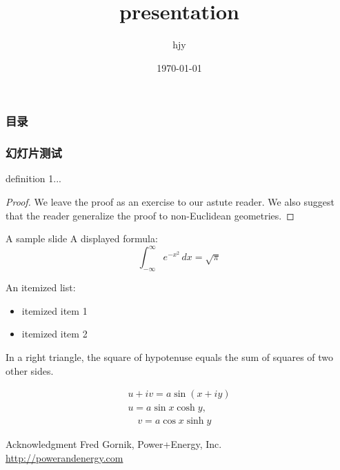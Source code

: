 \documentclass[12pt,a4paper]{beamer}
\author{hjy}
\title{presentation}
\institute{TongJi University}
\date{\today}
\begin{document}
\begin{CJK*}{UTF8}{gkai}
\begin{frame} 				
	\titlepage 
\end{frame}
	
\begin{frame}
	\frametitle{目录}
	\tableofcontents
\end{frame}
  
\begin{frame}
	\frametitle{幻灯片测试}
	\setlength{\fboxrule}{4pt} 
	
	\pause
	\begin{definition}
		definition 1...
	\end{definition}
	
	\begin{proof}
  		We leave the proof as an exercise to our astute reader.
  		We also suggest that the reader generalize the proof to
  		non-Euclidean geometries.
	\end{proof}
\end{frame}
    
\begin{frame}[label=sample]{A sample slide}
	A displayed formula:
	\[
		\int_{-\infty}^\infty e^{-x^2} \, dx = \sqrt{\pi}
	\]

	An itemized list:
	\begin{itemize}
  		\item itemized item 1
  		\item itemized item 2
	\end{itemize}

	\begin{theorem}
		In a right triangle, the square of hypotenuse equals
		the sum of squares of two other sides.
	\end{theorem}
	
	\begin{gather}
 		 u + iv = a \sin(x + iy) \\
  		u = a \sin x \cosh y, \\
  	 	\quad v = a \cos x \sinh y
	\end{gather}
\end{frame}

\begin{frame}{Acknowledgment}
Fred Gornik, Power+Energy, Inc.\\
\href{http://powerandenergy.com}{http://powerandenergy.com}


\end{frame}
\end{CJK*}
\end{document}
